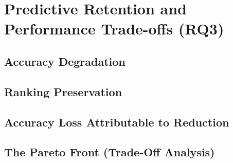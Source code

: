 \section{Predictive Retention and Performance Trade-offs (RQ3)}
\label{sec:results:rq3}

\subsection{Accuracy Degradation}
\label{sec:results:rq3:degradation}

\subsection{Ranking Preservation}
\label{sec:results:rq3:ranking}

\subsection{Accuracy Loss Attributable to Reduction}
\label{sec:results:rq3:attribution}

\subsection{The Pareto Front (Trade-Off Analysis)}
\label{sec:results:rq3:pareto}
